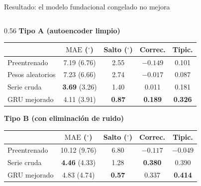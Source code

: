 \documentclass[aspectratio=169,10pt,t]{beamer}
\newcommand{\gr}{$^\circ$}
\newcommand{\mae}{\ensuremath{\mathrm{MAE}}}
\begin{document}
\begin{frame}{Resultado: el modelo fundacional congelado no mejora}
\begin{columns}[T]
\begin{column}{0.56\textwidth}
\footnotesize\setlength{\tabcolsep}{2.6pt}
\textbf{Tipo A (autoencoder limpio)}

\begin{tabular}{@{}lcccc@{}}
\toprule
 & \textbf{\mae{} (\gr)} & \textbf{Salto (\gr)} & \textbf{Correc.} & \textbf{Tipic.}\\
\midrule
Preentrenado & 7.19 (6.76) & 2.55 & $-0.149$ & 0.101\\
Pesos aleatorios & 7.23 (6.66) & 2.74 & $-0.017$ & 0.087\\
Serie cruda & \textbf{3.69} (3.26) & 1.40 & 0.011 & 0.181\\
\rowcolor{verdec}GRU mejorado & 4.11 (3.91) & \textbf{0.87} & \textbf{0.189} & \textbf{0.326}\\
\bottomrule
\end{tabular}

\vspace{5pt}
\textbf{Tipo B (con eliminación de ruido)}

\begin{tabular}{@{}lcccc@{}}
\toprule
 & \textbf{\mae{} (\gr)} & \textbf{Salto (\gr)} & \textbf{Correc.} & \textbf{Tipic.}\\
\midrule
Preentrenado & 10.12 (9.76) & 6.80 & $-0.117$ & $-0.049$\\
Serie cruda & \textbf{4.46} (4.33) & 1.28 & \textbf{0.380} & 0.390\\
\rowcolor{verdec}GRU mejorado & 4.83 (4.74) & \textbf{0.57} & 0.337 & \textbf{0.414}\\
\bottomrule
\end{tabular}


\end{column}
\end{columns}
\end{frame}
\end{document}

